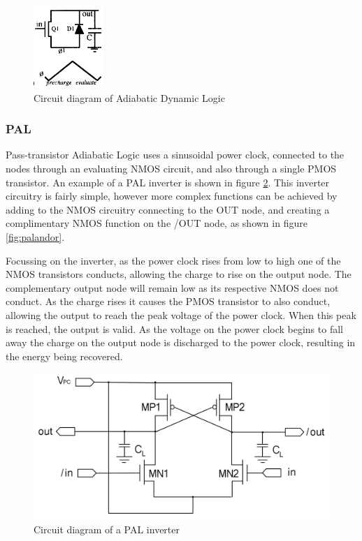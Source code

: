 \begin{figure}
	\centering
	\includegraphics[width=100px]{../../images/ADL.png}
	\caption{Circuit diagram of Adiabatic Dynamic Logic \cite{DynAdiabatic}}
	\label{fig:adl}
\end{figure}

\subsubsection{PAL}
\label{sec:PAL}
Pass-transistor Adiabatic Logic uses a sinusoidal power clock, connected to the nodes through an evaluating NMOS circuit, and also through a single PMOS transistor.
An example of a PAL inverter is shown in figure \ref{fig:pal}.
This inverter circuitry is fairly simple, however more complex functions can be achieved by adding to the NMOS circuitry connecting to the OUT node, and creating a complimentary NMOS function on the /OUT node, as shown in figure \ref{fig:palandor}.

Focussing on the inverter, as the power clock rises from low to high one of the NMOS transistors conducts, allowing the charge to rise on the output node.
The complementary output node will remain low as its respective NMOS does not conduct.
As the charge rises it causes the PMOS transistor to also conduct, allowing the output to reach the peak voltage of the power clock.
When this peak is reached, the output is valid.
As the voltage on the power clock begins to fall away the charge on the output node is discharged to the power clock, resulting in the energy being recovered.

\begin{figure}
	\centering
	\includegraphics[width=\columnwidth]{../../images/PAL.png}
	\caption{Circuit diagram of a PAL inverter \cite{LPAL}}
	\label{fig:pal}
\end{figure}

